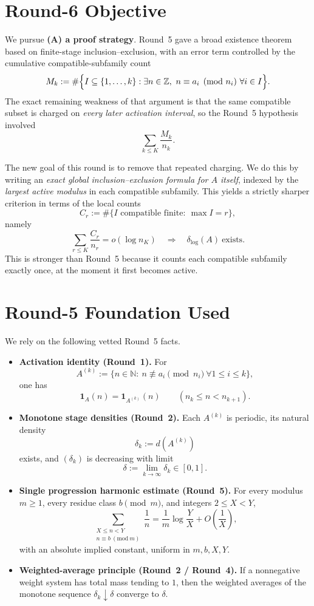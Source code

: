 \section{Round-6 Objective}
We pursue \textbf{(A) a proof strategy}.  Round~5 gave a broad existence theorem based on finite-stage inclusion--exclusion, with an error term controlled by the cumulative compatible-subfamily count
\[
M_k:=\#\Bigl\{I\subseteq\{1,\dots,k\}: \exists n\in\mathbb Z,\ n\equiv a_i \pmod{n_i}\ \forall i\in I\Bigr\}.
\]
The exact remaining weakness of that argument is that the same compatible subset is charged on \emph{every later activation interval}, so the Round~5 hypothesis involved
\[
\sum_{k\le K}\frac{M_k}{n_k}.
\]

The new goal of this round is to remove that repeated charging.  We do this by writing an \emph{exact global inclusion--exclusion formula for $A$ itself}, indexed by the \emph{largest active modulus} in each compatible subfamily.  This yields a strictly sharper criterion in terms of the local counts
\[
C_r:=\#\{I\text{ compatible finite}:\ \max I=r\},
\]
namely
\[
\sum_{r\le K}\frac{C_r}{n_r}=o(\log n_K)
\quad\Longrightarrow\quad
\delta_{\log}(A)\ \text{exists}.
\]
This is stronger than Round~5 because it counts each compatible subfamily exactly once, at the moment it first becomes active.

\section{Round-5 Foundation Used}
We rely on the following vetted Round~5 facts.
\begin{itemize}
\item \textbf{Activation identity (Round~1).}  For
\[
A^{(k)}:=\{n\in\mathbb N:\ n\not\equiv a_i\pmod{n_i}\ \forall 1\le i\le k\},
\]
one has
\[
\mathbf 1_A(n)=\mathbf 1_{A^{(k)}}(n)\qquad (n_k\le n<n_{k+1}).
\]
\item \textbf{Monotone stage densities (Round~2).}
Each $A^{(k)}$ is periodic, its natural density
\[
\delta_k:=d(A^{(k)})
\]
exists, and $(\delta_k)$ is decreasing with limit
\[
\delta:=\lim_{k\to\infty}\delta_k\in[0,1].
\]
\item \textbf{Single progression harmonic estimate (Round~5).}
For every modulus $m\ge 1$, every residue class $b\pmod m$, and integers $2\le X<Y$,
\[
\sum_{\substack{X\le n<Y\\ n\equiv b\ (\mathrm{mod}\ m)}}\frac1n
=
\frac1m\log\frac{Y}{X}+O\!\left(\frac1X\right),
\]
with an absolute implied constant, uniform in $m,b,X,Y$.
\item \textbf{Weighted-average principle (Round~2 / Round~4).}
If a nonnegative weight system has total mass tending to $1$, then the weighted averages of the monotone sequence $\delta_k\downarrow\delta$ converge to $\delta$.
\end{itemize}

